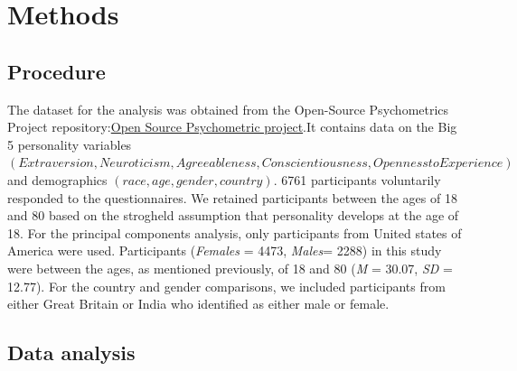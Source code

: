 \documentclass[
  english,
  man]{apa6}
\begin{document}
\hypertarget{methods}{%
\section{Methods}\label{methods}}

\hypertarget{procedure}{%
\subsection{Procedure}\label{procedure}}

The dataset for the analysis was obtained from the Open-Source Psychometrics Project repository:\href{https://openpsychometrics.org/_rawdata/}{Open Source Psychometric project}.It contains data on the Big 5 personality variables \((Extraversion, Neuroticism, Agreeableness, Conscientiousness, Openness to Experience)\) and demographics \((race, age, gender, country)\). 6761 participants voluntarily responded to the questionnaires. We retained participants between the ages of 18 and 80 based on the strogheld assumption that personality develops at the age of 18. For the principal components analysis, only participants from United states of America were used. Participants (\emph{Females} = 4473, \emph{Males}= 2288) in this study were between the ages, as mentioned previously, of 18 and 80 (\emph{M} = 30.07, \emph{SD} = 12.77).
For the country and gender comparisons, we included participants from either Great Britain or India who identified as either male or female.

\hypertarget{data-analysis}{%
\subsection{Data analysis}\label{data-analysis}}
\end{document}
